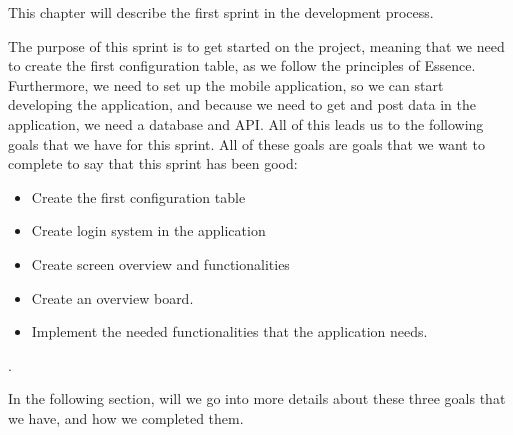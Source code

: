 This chapter will describe the first sprint in the development process.

The purpose of this sprint is to get started on the project, meaning that we need to create the first configuration table, as we follow the principles of Essence.
Furthermore, we need to set up the mobile application, so we can start developing the application, and because we need to get and post data in the application, we need a database and API.
All of this leads us to the following goals that we have for this sprint.
All of these goals are goals that we want to complete to say that this sprint has been good:

\begin{itemize}
    \item Create the first configuration table 
    \item Create login system in the application
    \item Create screen overview and functionalities
    \item Create an overview board.
    \item Implement the needed functionalities that the application needs.
\end{itemize}.

In the following section, will we go into more details about these three goals that we have, and how we completed them.
